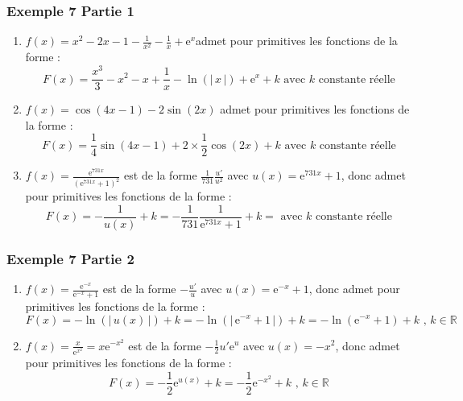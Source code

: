 \documentclass[11pt, hyperref={urlcolor=red,%
            linkcolor=blue, %
            colorlinks=true}]{beamer}
\newcommand{\R}{\mathbb{R}}
\newcommand{\e}{\text{e}}
\newcommand{\valabs}[1]{\big| \, #1 \, \big|}
\begin{document}
\begin{frame}
\frametitle{Exemple 7 Partie 1}

\label{exemple7}

\begin{enumerate}

 \item  $f(x)=x^2-2x-1-\frac{1}{x^2}-\frac{1}{x}+\text{e}^{x}$admet pour primitives les fonctions de la forme :
 $$F(x)=\frac{x^{3}}{3}-x^{2}-x+\frac{1}{x}-\ln(\valabs{x})+\text{e}^{x}+  k \text{ avec } k \text{ constante réelle}$$
 
\item  $f(x)=\cos(4x-1)-2\sin(2x)$   admet pour primitives les fonctions de la forme :
 $$F(x)=\frac{1}{4}\sin(4x-1) + 2\times \frac{1}{2} \cos(2x) +  k \text{ avec } k \text{ constante réelle}$$
 
 \item   $f(x)=\frac{\e^{731x}}{(\e^{731x}+1)^2}$  est de la forme $\frac{1}{731}\frac{u'}{u^{2}}$ avec $u(x)=\e^{731x}+1$, donc admet pour primitives les fonctions de la forme :
 $$F(x)=-\frac{1}{u(x)}+k=-\frac{1}{731}\frac{1}{\e^{731x}+1} +  k = \text{ avec } k \text{ constante réelle}$$


			
\end{enumerate}

\end{frame}




\begin{frame}
\frametitle{Exemple 7 Partie 2}

\begin{enumerate}



 \item   $f(x)=\frac{\e^{-x}}{\e^{-x}+1}$   est de la forme $-\frac{u'}{u}$ avec $u(x)=\e^{-x}+1$, donc admet pour primitives les fonctions de la forme :
 $$F(x)=-\ln(\valabs{u(x)})+k=-\ln(\valabs{\e^{-x}+1} )  +  k  = -\ln(\e^{-x}+1 )  +  k  \text{ , } k \in \R$$


 \item   $f(x)=\frac{x}{\text{e}^{x^2}}=x \text{e}^{-x^2}$    est de la forme $-\frac{1}{2}u'\text{e}^{u}$ avec $u(x)=-x^2$, donc admet pour primitives les fonctions de la forme :
 $$F(x)=-\frac{1}{2} \text{e}^{u(x)} +k=-\frac{1}{2} \text{e}^{-x^2}  +  k    \text{ , } k \in \R$$




 

			
\end{enumerate}

\end{frame}
\end{document}
